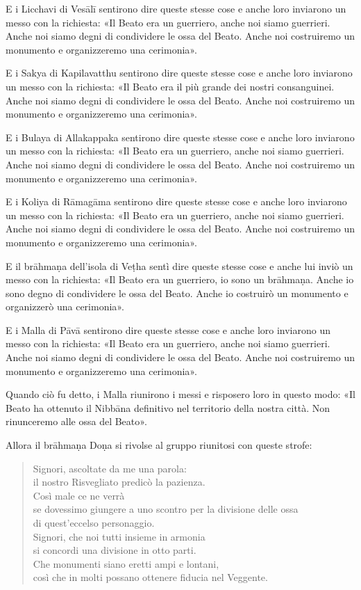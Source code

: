 E i Licchavi di Vesālī sentirono dire queste stesse cose e anche loro
inviarono un messo con la richiesta: «Il Beato era un guerriero, anche
noi siamo guerrieri. Anche noi siamo degni di condividere le ossa del
Beato. Anche noi costruiremo un monumento e organizzeremo una
cerimonia».


E i Sakya di Kapilavatthu sentirono dire queste stesse cose e anche loro
inviarono un messo con la richiesta: «Il Beato era il più grande dei
nostri consanguinei. Anche noi siamo degni di condividere le ossa del
Beato. Anche noi costruiremo un monumento e organizzeremo una
cerimonia».


E i Bulaya di Allakappaka sentirono dire queste stesse cose e anche loro
inviarono un messo con la richiesta: «Il Beato era un guerriero, anche
noi siamo guerrieri. Anche noi siamo degni di condividere le ossa del
Beato. Anche noi costruiremo un monumento e organizzeremo una
cerimonia».


E i Koliya di Rāmagāma sentirono dire queste stesse cose e anche loro
inviarono un messo con la richiesta: «Il Beato era un guerriero, anche
noi siamo guerrieri. Anche noi siamo degni di condividere le ossa del
Beato. Anche noi costruiremo un monumento e organizzeremo una
cerimonia».


E il brāhmaṇa dell’isola di Veṭha sentì dire queste stesse cose e anche
lui inviò un messo con la richiesta: «Il Beato era un guerriero, io sono
un brāhmaṇa. Anche io sono degno di condividere le ossa del Beato. Anche
io costruirò un monumento e organizzerò una cerimonia».


E i Malla di Pāvā sentirono dire queste stesse cose e anche loro
inviarono un messo con la richiesta: «Il Beato era un guerriero, anche
noi siamo guerrieri. Anche noi siamo degni di condividere le ossa del
Beato. Anche noi costruiremo un monumento e organizzeremo una
cerimonia».


Quando ciò fu detto, i Malla riunirono i messi e risposero loro in
questo modo: «Il Beato ha ottenuto il Nibbāna definitivo nel territorio
della nostra città. Non rinunceremo alle ossa del Beato».


Allora il brāhmaṇa Doṇa si rivolse al gruppo riunitosi con queste
strofe:


\begin{quote}
Signori, ascoltate da me una parola: \\
il nostro Risvegliato predicò la pazienza. \\
Così male ce ne verrà \\
se dovessimo giungere a uno scontro per la divisione delle ossa \\
di quest’eccelso personaggio. \\
Signori, che noi tutti insieme in armonia \\
si concordi una divisione in otto parti. \\
Che monumenti siano eretti ampi e lontani, \\
così che in molti possano ottenere fiducia nel Veggente.
\end{quote}

